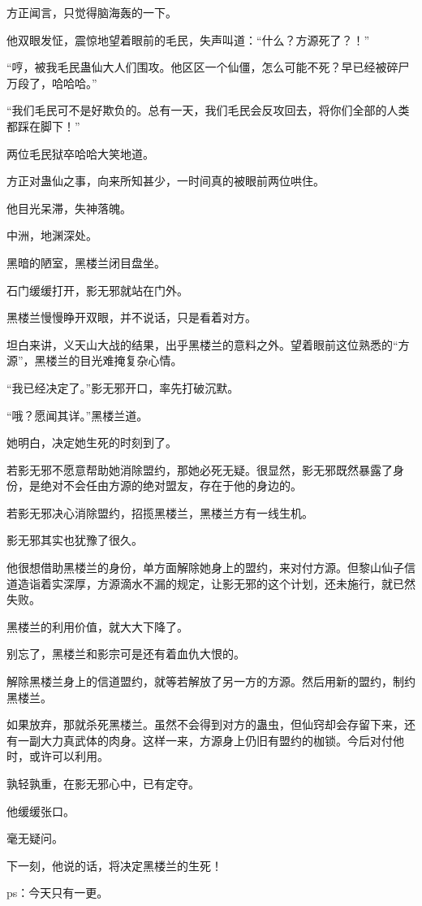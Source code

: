 \begin{this_body}
方正闻言，只觉得脑海轰的一下。

他双眼发怔，震惊地望着眼前的毛民，失声叫道：“什么？方源死了？！”

“哼，被我毛民蛊仙大人们围攻。他区区一个仙僵，怎么可能不死？早已经被碎尸万段了，哈哈哈。”

“我们毛民可不是好欺负的。总有一天，我们毛民会反攻回去，将你们全部的人类都踩在脚下！”

两位毛民狱卒哈哈大笑地道。

方正对蛊仙之事，向来所知甚少，一时间真的被眼前两位哄住。

他目光呆滞，失神落魄。

中洲，地渊深处。

黑暗的陋室，黑楼兰闭目盘坐。

石门缓缓打开，影无邪就站在门外。

黑楼兰慢慢睁开双眼，并不说话，只是看着对方。

坦白来讲，义天山大战的结果，出乎黑楼兰的意料之外。望着眼前这位熟悉的“方源”，黑楼兰的目光难掩复杂心情。

“我已经决定了。”影无邪开口，率先打破沉默。

“哦？愿闻其详。”黑楼兰道。

她明白，决定她生死的时刻到了。

若影无邪不愿意帮助她消除盟约，那她必死无疑。很显然，影无邪既然暴露了身份，是绝对不会任由方源的绝对盟友，存在于他的身边的。

若影无邪决心消除盟约，招揽黑楼兰，黑楼兰方有一线生机。

影无邪其实也犹豫了很久。

他很想借助黑楼兰的身份，单方面解除她身上的盟约，来对付方源。但黎山仙子信道造诣着实深厚，方源滴水不漏的规定，让影无邪的这个计划，还未施行，就已然失败。

黑楼兰的利用价值，就大大下降了。

别忘了，黑楼兰和影宗可是还有着血仇大恨的。

解除黑楼兰身上的信道盟约，就等若解放了另一方的方源。然后用新的盟约，制约黑楼兰。

如果放弃，那就杀死黑楼兰。虽然不会得到对方的蛊虫，但仙窍却会存留下来，还有一副大力真武体的肉身。这样一来，方源身上仍旧有盟约的枷锁。今后对付他时，或许可以利用。

孰轻孰重，在影无邪心中，已有定夺。

他缓缓张口。

毫无疑问。

下一刻，他说的话，将决定黑楼兰的生死！

ps：今天只有一更。

\end{this_body}

